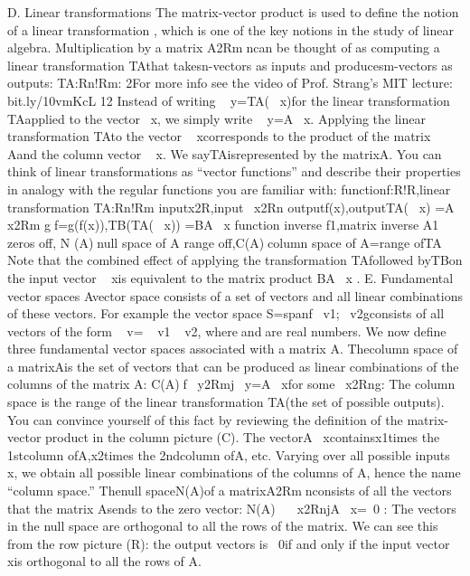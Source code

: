 D. Linear transformations
The matrix-vector product is used to deﬁne the notion of a linear
transformation , which is one of the key notions in the study of linear
algebra. Multiplication by a matrix A2Rmncan be thought of as
computing a linear transformation TAthat takesn-vectors as inputs and
producesm-vectors as outputs:
TA:Rn!Rm:
2For more info see the video of Prof. Strang’s MIT lecture: bit.ly/10vmKcL
12
Instead of writing ~ y=TA\left(~ x\right)for the linear transformation TAapplied to
the vector~ x, we simply write ~ y=A~ x. Applying the linear transformation
TAto the vector ~ xcorresponds to the product of the matrix Aand the
column vector ~ x. We sayTAisrepresented by the matrixA.
You can think of linear transformations as “vector functions” and describe
their properties in analogy with the regular functions you are familiar with:
functionf:R!R,linear transformation TA:Rn!Rm
inputx2R,input~ x2Rn
outputf\left(x\right),outputTA\left(~ x\right) =A~ x2Rm
gf=g\left(f\left(x\right)\right),TB\left(TA\left(~ x\right)\right) =BA~ x
function inverse f 1,matrix inverse A 1
zeros off, N \left(A\right)null space of A
range off,C\left(A\right)column space of A=range ofTA
Note that the combined effect of applying the transformation TAfollowed
byTBon the input vector ~ xis equivalent to the matrix product BA~ x .
E. Fundamental vector spaces
Avector space consists of a set of vectors and all linear combinations of
these vectors. For example the vector space S=spanf~ v1;~ v2gconsists of
all vectors of the form ~ v=~ v1\+~ v2, whereandare real numbers.
We now deﬁne three fundamental vector spaces associated with a matrix A.
Thecolumn space of a matrixAis the set of vectors that can be produced
as linear combinations of the columns of the matrix A:
C\left(A\right)f~ y2Rmj~ y=A~ xfor some~ x2Rng:
The column space is the range of the linear transformation TA\left(the set
of possible outputs\right). You can convince yourself of this fact by reviewing
the deﬁnition of the matrix-vector product in the column picture \left(C\right). The
vectorA~ xcontainsx1times the 1stcolumn ofA,x2times the 2ndcolumn
ofA, etc. Varying over all possible inputs ~ x, we obtain all possible linear
combinations of the columns of A, hence the name “column space.”
Thenull spaceN\left(A\right)of a matrixA2Rmnconsists of all the vectors
that the matrix Asends to the zero vector:
N\left(A\right)
~ x2RnjA~ x=~0	
:
The vectors in the null space are orthogonal to all the rows of the matrix.
We can see this from the row picture \left(R\right): the output vectors is ~0if and
only if the input vector ~ xis orthogonal to all the rows of A.
